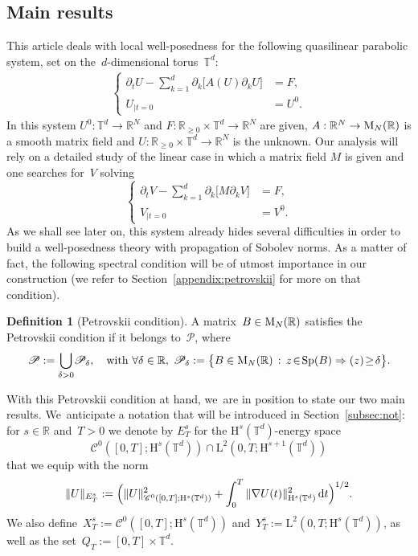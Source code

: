 \documentclass[10pt]{amsart}
\let\Re\relax
\DeclareMathOperator{\Re}{Re}
\theoremstyle{definition}
\newtheorem{defi}[prop]{Definition}
\newcommand\R{\mathbb{R}}
\newcommand\T{\mathbb{T}}
\newcommand\dd{\mathrm{d}}
\renewcommand\H{\mathrm{H}}
\renewcommand\L{\mathrm{L}}
\begin{document}
\subsection{Main results}
This article deals with local well-posedness for the following quasilinear parabolic system, set on the~$d$-dimensional torus~$\T^d$:
\begin{align}
\label{eq:PtNL}
\left\{
\begin{aligned}
\partial_t U-\sum_{k=1}^d\partial_k \bigl[A(U)\partial_k U\bigr] &= F,\\
U_{|t=0} &= U^0.
\end{aligned}
\right.
\end{align}
In this system $U^0: \T^d \to \R^N$ and $F:\R_{\geq 0}\times \T^d\to \R^N $ are given, $A:\R^N\to\textnormal{M}_N(\R)$ is a smooth matrix field and $U:\R_{\geq 0}\times \T^d\to \R^N $ is the unknown. Our analysis will rely on a detailed study of the linear case in which a matrix field $M$ is given and one searches for~$V$ solving
\begin{equation}
\label{eq:Pt}
\left\{
\begin{aligned}
\partial_t V-\sum_{k=1}^d\partial_k \bigl[M\partial_k V\bigr] &= F,\\
V_{|t=0} &= V^0.
\end{aligned}
\right.
\end{equation}
As we shall see later on, this system already hides several difficulties in order to build a well-posedness theory with propagation of Sobolev norms. As a matter of fact, the following spectral condition will be of utmost importance in our construction (we refer to Section~\ref{appendix:petrovskii} for more on that condition).
\begin{defi}[Petrovskii condition]
A matrix~$B\in\textnormal{M}_N(\R)$ satisfies the Petrovskii condition if it belongs to~$\mathscr{P}$, where
\begin{equation} \label{eq:Pet}\mathscr{P}:=\bigcup_{\delta>0}\!\mathscr{P}_\delta,\quad \text{with } \forall \delta \in \R, \; \mathscr{P}_\delta:= \bigl\{B\in\textnormal{M}_N(\R)\,:\,z\!\in\! \textnormal{Sp}(B) \Rightarrow \Re(z)\!\geq\! \delta\bigr\}.
\end{equation}
\end{defi}
With this Petrovskii condition at hand, we~are in position to state our two main results. We~anticipate a notation that will be introduced in Section~\ref{subsec:not}: for $s\in\R$ and~$T>0$ we denote by $E_T^s$ for the $\H^s(\T^d)$-energy space
\[
\mathscr{C}^0([0,T];\H^s(\T^d))\cap\L^2(0,T;\H^{s+1}(\T^d))
\]
that we equip with the norm
\[
\|U\|_{E_T^s}:=\Bigl(\|U\|_{\mathscr{C}^0([0,T];\H^s(\T^d))}^2 + \int_0^T \|\nabla U(t)\|_{\H^s(\T^d)}^2\,\dd t\Bigr)^{1/2}.
\]
We also define~$X_T^s:=\mathscr{C}^0([0,T];\H^s(\T^d))$ and~$Y_T^s:=\L^2(0,T;\H^{s}(\T^d))$, as well as the set~$Q_T:=[0,T] \times \T^d$.
\end{document}
